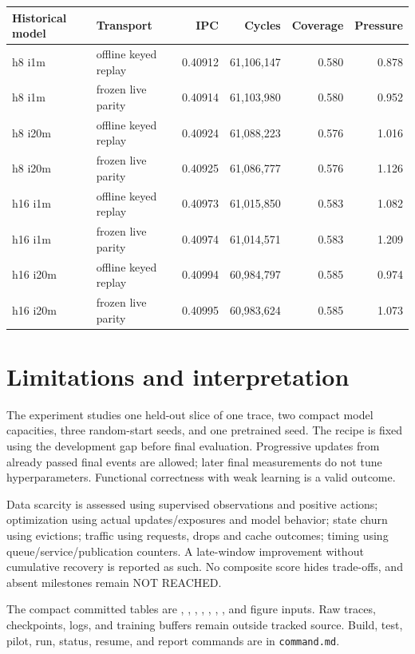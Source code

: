 \documentclass[10pt]{article}
\begin{document}
\begin{center}
\scriptsize
\begin{longtable}{llrrrr}
\toprule
Historical model & Transport & IPC & Cycles & Coverage & Pressure \\
\midrule
\endhead
h8 i1m & offline keyed replay & 0.40912 & 61,106,147 & 0.580 & 0.878 \\
h8 i1m & frozen live parity & 0.40914 & 61,103,980 & 0.580 & 0.952 \\
h8 i20m & offline keyed replay & 0.40924 & 61,088,223 & 0.576 & 1.016 \\
h8 i20m & frozen live parity & 0.40925 & 61,086,777 & 0.576 & 1.126 \\
h16 i1m & offline keyed replay & 0.40973 & 61,015,850 & 0.583 & 1.082 \\
h16 i1m & frozen live parity & 0.40974 & 61,014,571 & 0.583 & 1.209 \\
h16 i20m & offline keyed replay & 0.40994 & 60,984,797 & 0.585 & 0.974 \\
h16 i20m & frozen live parity & 0.40995 & 60,983,624 & 0.585 & 1.073 \\
\bottomrule
\end{longtable}
\end{center}

\section{Limitations and interpretation}

The experiment studies one held-out slice of one trace, two compact model capacities, three random-start seeds, and one pretrained seed. The recipe is fixed using the development gap before final evaluation. Progressive updates from already passed final events are allowed; later final measurements do not tune hyperparameters. Functional correctness with weak learning is a valid outcome.

Data scarcity is assessed using supervised observations and positive actions; optimization using actual updates/exposures and model behavior; state churn using evictions; traffic using requests, drops and cache outcomes; timing using queue/service/publication counters. A late-window improvement without cumulative recovery is reported as such. No composite score hides trade-offs, and absent milestones remain NOT REACHED.

The compact committed tables are , , , , , , , and figure inputs. Raw traces, checkpoints, logs, and training buffers remain outside tracked source. Build, test, pilot, run, status, resume, and report commands are in \texttt{command.md}.
\end{document}
